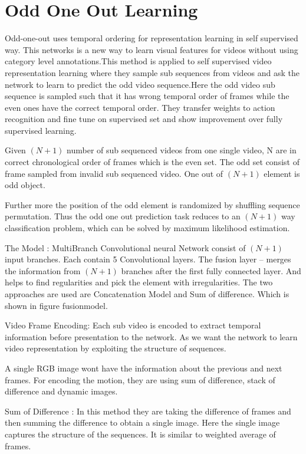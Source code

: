 \section{Odd One Out Learning}

Odd-one-out uses temporal ordering for representation learning in self supervised way.
This networks is a new way to learn visual features for videos without using category level annotations.This method is applied to self supervised video representation learning where they sample sub sequences from videos and ask the network to learn to predict the odd video sequence.Here the odd video sub sequence is sampled such that it has wrong temporal order of frames while the even ones have the correct temporal order. 
They transfer weights to action recognition and fine tune on supervised set and show improvement over fully supervised learning.

Given $(N+1)$ number of sub sequenced videos from one single video, N are in correct chronological order of frames which is the even set. The odd set consist of frame sampled from invalid sub sequenced video. One out of $(N+1)$ element is odd object.

Further more the position of the odd element is randomized by shuffling sequence permutation.
Thus the odd one out prediction task reduces to an $(N+1)$ way classification problem, which can be solved by maximum likelihood estimation. 

The Model :  MultiBranch Convolutional neural Network consist of $(N+1)$ input branches. 
Each contain 5 Convolutional layers. 
The fusion layer -- merges the information from $(N+1)$ branches after the first fully connected layer. And helps to find regularities and pick the element with irregularities. The two approaches are used are Concatenation Model and Sum of difference. Which is shown in figure fusionmodel.

Video Frame Encoding: Each sub video is encoded to extract temporal information before presentation to the network. As we want the network to learn video representation by exploiting the structure of sequences. 

A single RGB image wont have the information about the previous and next frames. For encoding the motion, they are using sum of difference, stack of difference and dynamic images.

Sum of Difference : In this method they are taking the difference of frames and then summing the difference to obtain a single image. Here the single image captures the structure of the sequences. 
It is similar to weighted average of frames.

